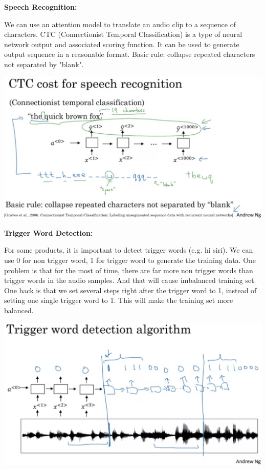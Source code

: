 \documentclass{article}
\begin{document}
\noindent \textbf{Speech Recognition:}

\noindent We can use an attention model to translate an audio clip to a sequence of characters. CTC (Connectionist Temporal Classification) is a type of neural network output and associated scoring function. It can be used to generate output sequence in a reasonable format. Basic rule: collapse repeated characters not separated by "blank".

\begin{center}
\includegraphics[scale=0.3]{./images/speech_recognition.png}
\end{center}

\noindent \textbf{Trigger Word Detection:}

\noindent For some products, it is important to detect trigger words (e.g. hi siri). We can use 0 for non trigger word, 1 for trigger word to generate the training data. One problem is that for the most of time, there are far more non trigger words than trigger words in the audio samples. And that will cause imbalanced training set. One hack is that we set several steps right after the trigger word to 1, instead of setting one single trigger word to 1. This will make the training set more balanced.

\begin{center}
\includegraphics[scale=0.3]{./images/trigger_word_detection.png}
\end{center}
\end{document}
